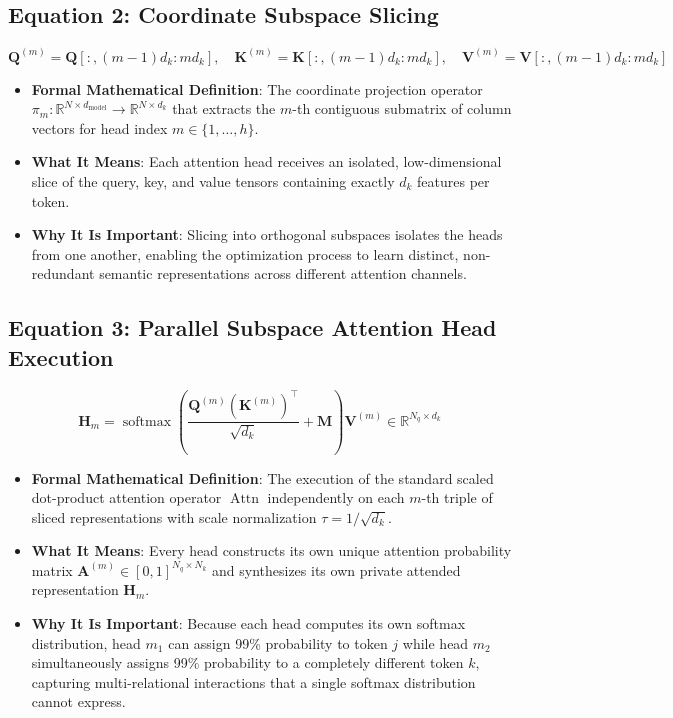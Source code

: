 \documentclass[11pt,a4paper]{article}
\theoremstyle{definition}
\begin{document}
\subsection{\textbf{Equation 2: Coordinate Subspace Slicing}}
{\boldmath
\begin{equation}
\mathbf{Q}^{(m)} = \mathbf{Q}[:, (m-1)d_k : m d_k], \quad \mathbf{K}^{(m)} = \mathbf{K}[:, (m-1)d_k : m d_k], \quad \mathbf{V}^{(m)} = \mathbf{V}[:, (m-1)d_k : m d_k]
\end{equation}
}
\begin{itemize}
    \item \textbf{Formal Mathematical Definition}:
    The coordinate projection operator $\pi_m: \mathbb{R}^{N \times d_{\text{model}}} \to \mathbb{R}^{N \times d_k}$ that extracts the $m$-th contiguous submatrix of column vectors for head index $m \in \{1, \dots, h\}$.
    \item \textbf{What It Means}:
    Each attention head receives an isolated, low-dimensional slice of the query, key, and value tensors containing exactly $d_k$ features per token.
    \item \textbf{Why It Is Important}:
    Slicing into orthogonal subspaces isolates the heads from one another, enabling the optimization process to learn distinct, non-redundant semantic representations across different attention channels.
\end{itemize}

\subsection{\textbf{Equation 3: Parallel Subspace Attention Head Execution}}
{\boldmath
\begin{equation}
\mathbf{H}_m = \operatorname{softmax}\left(\frac{\mathbf{Q}^{(m)}(\mathbf{K}^{(m)})^\top}{\sqrt{d_k}} + \mathbf{M}\right)\mathbf{V}^{(m)} \in \mathbb{R}^{N_q \times d_k}
\end{equation}
}
\begin{itemize}
    \item \textbf{Formal Mathematical Definition}:
    The execution of the standard scaled dot-product attention operator $\operatorname{Attn}$ independently on each $m$-th triple of sliced representations with scale normalization $\tau = 1/\sqrt{d_k}$.
    \item \textbf{What It Means}:
    Every head constructs its own unique attention probability matrix $\mathbf{A}^{(m)} \in [0, 1]^{N_q \times N_k}$ and synthesizes its own private attended representation $\mathbf{H}_m$.
    \item \textbf{Why It Is Important}:
    Because each head computes its own softmax distribution, head $m_1$ can assign 99\% probability to token $j$ while head $m_2$ simultaneously assigns 99\% probability to a completely different token $k$, capturing multi-relational interactions that a single softmax distribution cannot express.
\end{itemize}
\end{document}

